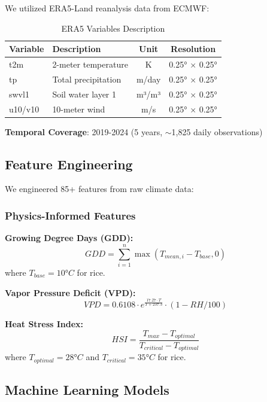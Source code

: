 \documentclass[conference,11pt]{IEEEtran}
\begin{document}
We utilized ERA5-Land reanalysis data from ECMWF:

\begin{table}[h]
\centering
\caption{ERA5 Variables Description}
\begin{tabular}{|l|l|c|c|}
\hline
\textbf{Variable} & \textbf{Description} & \textbf{Unit} & \textbf{Resolution} \\
\hline
t2m & 2-meter temperature & K & 0.25° × 0.25° \\
\hline
tp & Total precipitation & m/day & 0.25° × 0.25° \\
\hline
swvl1 & Soil water layer 1 & m³/m³ & 0.25° × 0.25° \\
\hline
u10/v10 & 10-meter wind & m/s & 0.25° × 0.25° \\
\hline
\end{tabular}
\end{table}

\textbf{Temporal Coverage}: 2019-2024 (5 years, $\sim$1,825 daily observations)

\subsection{Feature Engineering}

We engineered 85+ features from raw climate data:

\subsubsection{Physics-Informed Features}

\textbf{Growing Degree Days (GDD):}
\begin{equation}
GDD = \sum_{i=1}^{n} \max(T_{mean,i} - T_{base}, 0)
\end{equation}
where $T_{base} = 10°C$ for rice.

\textbf{Vapor Pressure Deficit (VPD):}
\begin{equation}
VPD = 0.6108 \cdot e^{\frac{17.27 \cdot T}{T + 237.3}} \cdot (1 - RH/100)
\end{equation}

\textbf{Heat Stress Index:}
\begin{equation}
HSI = \frac{T_{max} - T_{optimal}}{T_{critical} - T_{optimal}}
\end{equation}
where $T_{optimal} = 28°C$ and $T_{critical} = 35°C$ for rice.

\subsection{Machine Learning Models}
\end{document}
